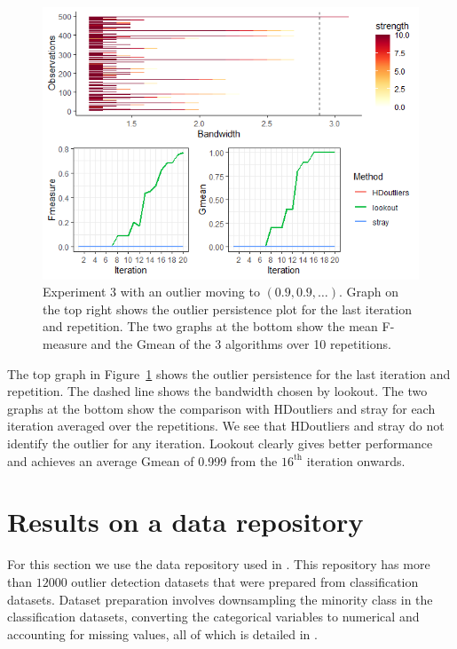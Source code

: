 \documentclass[letter,12pt]{article}
\begin{document}
\begin{figure}[!ht]
    \centering
    \includegraphics[scale=0.8]{Graphics/Comparison_Ex3.png}
    \caption{Experiment 3 with an outlier moving to $(0.9, 0.9, \ldots)$. Graph on the top right shows the outlier persistence plot for the last iteration and repetition. The  two graphs at the bottom show the mean F-measure and the Gmean of the 3 algorithms over 10 repetitions. }
    \label{fig:ComparisonEx3}
\end{figure}

The top graph in Figure~\ref{fig:ComparisonEx3} shows the outlier persistence for the last iteration and repetition. The dashed line shows the bandwidth chosen by lookout. The two graphs at the bottom show the comparison with HDoutliers and stray for each iteration averaged over the repetitions. We see that HDoutliers and stray do not identify the outlier for any iteration. Lookout clearly gives better performance and achieves an average Gmean of 0.999  from the $16^{\text{th}}$ iteration onwards. 
\section{Results on  a data repository}\label{sec:applications}
For this section we use the data repository used in \cite{datasets}. This repository has more than $12000$ outlier detection datasets that were prepared from classification datasets. Dataset preparation involves downsampling the minority class in the classification datasets, converting the categorical variables to  numerical and accounting for missing values, all of which is detailed in \cite{normalizationoutliers} . 
\end{document}
